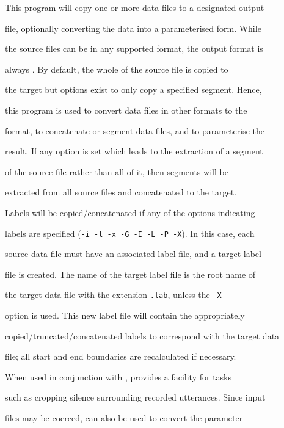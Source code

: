 

This program will copy one or more data files to a designated output


file, optionally converting the data into a parameterised form.  While


the source files can be in any supported format, the output format is


always \HTKFF.  By default, the whole of the source file is copied to


the target but options exist to only copy a specified segment.  Hence,


this program is used to convert data files in other formats to the \HTKFF\ 


format, to concatenate or segment data files, and to parameterise the


result.  If any option is set which leads to the extraction of a segment


of the source file rather than all of it, then segments will be


extracted from all source files and concatenated to the target.





Labels will be copied/concatenated if any of the options indicating


labels are specified (\texttt{-i -l -x -G -I -L -P -X}). In this case, each


source data file must have an associated label file, and a target label


file is created. The name of the target label file is the root name of


the target data file with the extension \texttt{.lab}, unless the \texttt{-X}


option is used.  This new label file will contain the appropriately


copied/truncated/concatenated labels to correspond with the target data


file; all start and end boundaries are recalculated if necessary. 





When used in conjunction with ,  provides a facility for tasks


such as cropping silence surrounding recorded utterances.  Since input


files may be coerced,  can also be used to convert the parameter



